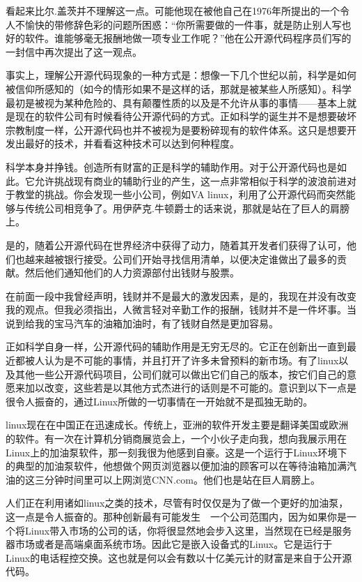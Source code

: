 看起来比尔.盖茨并不理解这一点。可能他现在被他自己在1976年所提出的一个令人不愉快的带修辞色彩的问题所困惑：“你所需要做的一件事，就是防止别人写也好的软件。谁能够毫无报酬地做一项专业工作呢？”他在公开源代码程序员们写的一封信中再次提出了这一观点。

事实上，理解公开源代码现象的一种方式是：想像一下几个世纪以前，科学是如何被信仰所感知的（如今的情形如果不是这样的话，那就是被某些人所感知）。科学最初是被视为某种危险的、具有颠覆性质的以及是不允许从事的事情——基本上就是现在的软件公司有时候看待公开源代码的方式。正如科学的诞生并不是想要破坏宗教制度一样，公开源代码也并不被视为是要粉碎现有的软件体系。这只是想要开发出最好的技术，并看看这种技术可以达到何种程度。

科学本身并挣钱。创造所有财富的正是科学的辅助作用。对于公开源代码也是如此。它允许挑战现有商业的辅助行业的产生，这一点非常相似于科学的波浪前进对于教堂的挑战。你会发现一些小公司，例如VA linux，利用了公开源代码而突然能够与传统公司相竞争了。用伊萨克.牛顿爵士的话来说，那就是站在了巨人的肩膀上。

是的，随着公开源代码在世界经济中获得了动力，随着其开发者们获得了认可，他们也越来越被银行接受。公司们开始寻找信用清单，以便决定谁做出了最多的贡献。然后他们通知他们的人力资源部付出钱财与股票。

在前面一段中我曾经声明，钱财并不是最大的激发因素，是的，我现在并没有改变我的观点。但我必须指出，人微言轻对辛勤工作的报酬，钱财并不是一件坏事。当说到给我的宝马汽车的油箱加油时，有了钱财自然是更加容易。

正如科学自身一样，公开源代码的辅助作用是无穷无尽的。它正在创新出一直到最近都被人认为是不可能的事情，并且打开了许多未曾预料的新市场。有了linux以及其他一些公开源代码项目，公司们就可以做出它们自己的版本，按它们自己的意愿来加以改变，这些若是以其他方式杰进行的话则是不可能的。意识到以下一点是很令人振奋的，通过Linux所做的一切事情在一开始就不是孤独无助的。

linux现在在中国正在迅速成长。传统上，亚洲的软件开发主要是翻译美国或欧洲的软件。有一次在计算机分销商展览会上，一个小伙子走向我，想向我展示用在Linux上的加油泵软件，那一刻我很为他感到自豪。这是一个运行于Linux环境下的典型的加油泵软件，他想做个网页浏览器以便加油的顾客可以在等待油箱加满汽油的这三分钟时间里可以上网浏览CNN.com。他们也是站在巨人肩膀上。

人们正在利用诸如linux之类的技术，尽管有时仅仅是为了做一个更好的加油泵，这一点是令人振奋的。那种创新最有可能发生　一个公司范围内，因为如果你是一个将Linux带入市场的公司的话，你将很显然地会步入这里，当然现在已经是服务器市场或者是高端桌面系统市场。因此它是嵌入设备式的Linux。它是运行于Linux的电话程控交换。这也就是何以会有数以十亿美元计的财富是来自于公开源代码。

